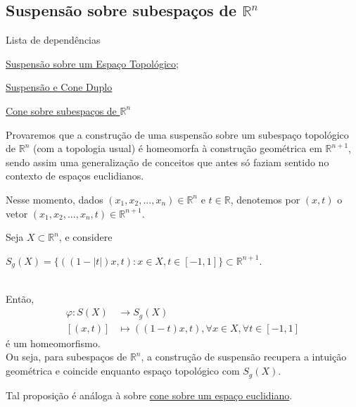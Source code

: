 \subsection{Suspensão sobre subespaços de $\mathbb{R}^n$}
\label{suspensao-euclidiano-prop}
\begin{titlemize}{Lista de dependências}
	\item \hyperref[suspensao-def]{Suspensão sobre um Espaço Topológico};
    \item \hyperref[suspensao-cone-duplo-prop]{Suspensão e Cone Duplo}
    \item \hyperref[cone-euclidiano-prop]{Cone sobre subespaços de $\mathbb{R}^n$}
\end{titlemize}
Provaremos que a construção de uma suspensão sobre um subespaço topológico de $\mathbb{R}^n$ (com a topologia usual) é homeomorfa à construção geométrica em $\mathbb{R}^{n+1}$, sendo assim uma generalização de conceitos que antes só faziam sentido no contexto de espaços euclidianos.

Nesse momento, dados $(x_1,x_2,...,x_n) \in \mathbb{R}^n$ e $t \in \mathbb{R}$, denotemos por $(x,t)$ o vetor $(x_1,x_2,...,x_n,t) \in \mathbb{R}^{n+1}$.

\begin{prop}
	Seja $X \subset \mathbb{R}^n$, e considere\\
    \centerline{$S_g(X) = \{((1-|t|)x,t):x\in X, t\in [-1,1]\} \subset \mathbb{R}^{n+1}$.}\\
    Então,\begin{align*}
        \varphi: S(X) &\rightarrow S_g(X)\\
        [(x,t)] &\mapsto ((1-t)x,t), \forall x\in X, \forall t \in [-1,1]
    \end{align*}
    é um homeomorfismo.\\
    Ou seja, para subespaços de $\mathbb{R}^n$, a construção de suspensão recupera a intuição geométrica e coincide enquanto espaço topológico com $S_g(X)$.
\end{prop}

Tal proposição é análoga à sobre \hyperref[cone-euclidiano-prop]{cone sobre um espaço euclidiano}.

